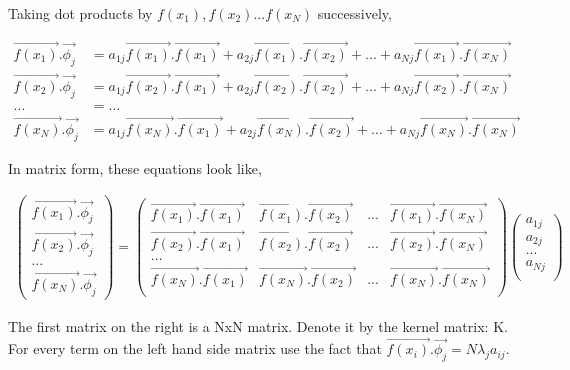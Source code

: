 \documentclass[11pt, a4paper]{article}
\begin{document}
Taking dot products by $f(x_1), f(x_2) ... f(x_N)$ successively,

\begin{align*}
	\vec{f(x_1)}.\vec{\phi_j} & = a_{1j}\vec{f(x_1)}.\vec{f(x_1)} + a_{2j}\vec{f(x_1)}.\vec{f(x_2)} + ... + a_{Nj}\vec{f(x_1)}.\vec{f(x_N)} \\
	\vec{f(x_2)}.\vec{\phi_j} & = a_{1j}\vec{f(x_2)}.\vec{f(x_1)} + a_{2j}\vec{f(x_2)}.\vec{f(x_2)} + ... + a_{Nj}\vec{f(x_2)}.\vec{f(x_N)} \\ 
	...                       & = ...                                                                                                       \\
	\vec{f(x_N)}.\vec{\phi_j} & = a_{1j}\vec{f(x_N)}.\vec{f(x_1)} + a_{2j}\vec{f(x_N)}.\vec{f(x_2)} + ... + a_{Nj}\vec{f(x_N)}.\vec{f(x_N)} 
\end{align*}

In matrix form, these equations look like,

\begin{align*}
	\begin{pmatrix}
	\vec{f(x_1)}.\vec{\phi_j} \\
	\vec{f(x_2)}.\vec{\phi_j} \\
	... \\
	\vec{f(x_N)}.\vec{\phi_j} 
	\end{pmatrix} = \begin{pmatrix}
	\vec{f(x_1)}.\vec{f(x_1)} & \vec{f(x_1)}.\vec{f(x_2)} & ... & \vec{f(x_1)}.\vec{f(x_N)} \\
	\vec{f(x_2)}.\vec{f(x_1)} & \vec{f(x_2)}.\vec{f(x_2)} & ... & \vec{f(x_2)}.\vec{f(x_N)} \\
	... \\
	\vec{f(x_N)}.\vec{f(x_1)} & \vec{f(x_N)}.\vec{f(x_2)} & ... & \vec{f(x_N)}.\vec{f(x_N)} \\
	\end{pmatrix} \begin{pmatrix}
	a_{1j} \\
	a_{2j} \\
	... \\
	a_{Nj} \\
	\end{pmatrix}
\end{align*}

The first matrix on the right is a NxN matrix. Denote it by the kernel matrix: K. For every term on the left hand side matrix use the fact that $\vec{f(x_i)}.\vec{\phi_j} = N\lambda_j a_{ij}$.
\end{document}
